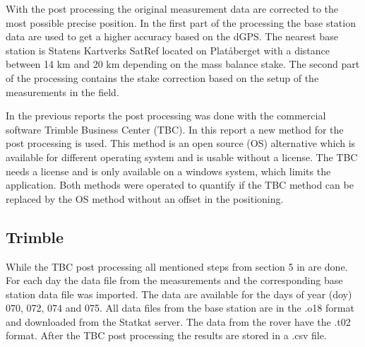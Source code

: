 
With the post processing the original measurement data are corrected to the most possible precise position.
In the first part of the processing the base station data are used to get a higher accuracy based on the dGPS.
The nearest base station is Statens Kartverks SatRef located on Platåberget with a distance between 14 km and 20 km depending on the mass balance stake.
The second part of the processing contains the stake correction based on the setup of the measurements in the field.
\medskip

In the previous reports the post processing was done with the commercial software Trimble Business Center (TBC). 
In this report a new method for the post processing is used. 
This method is an open source (OS) alternative which is available for different operating system and is usable without a license. 
The TBC needs a license and is only available on a windows system, which limits the application. 
Both methods were operated to quantify if the TBC method can be replaced by the OS method without an offset in the positioning.

\subsection{Trimble}

While the TBC post processing all mentioned steps from section 5 in \cite{Trquickstart} are done.
For each day the data file from the measurements and the corresponding base station data file was imported. 
The data are available for the days of year (doy) 070, 072, 074 and 075.
All data files from the base station are in the .o18 format and downloaded from the Statkat server.
The data from the rover have the .t02 format. 
After the TBC post processing the results are stored in a .csv file.
\medskip

